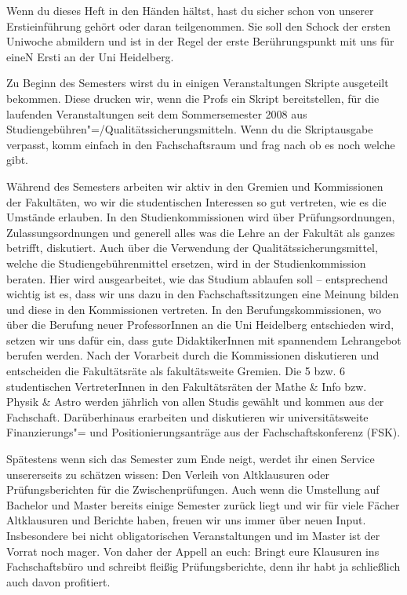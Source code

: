 Wenn du dieses Heft in den Händen hältst, hast du sicher schon von unserer Erstieinführung gehört oder daran teilgenommen. Sie soll den Schock der ersten Uniwoche abmildern und ist in der Regel der erste Berührungspunkt mit uns für eineN Ersti an der Uni Heidelberg.

Zu Beginn des Semesters wirst du in einigen Veranstaltungen Skripte ausgeteilt bekommen. Diese drucken wir, wenn die Profs ein Skript bereitstellen, für die laufenden Veranstaltungen seit dem Sommersemester 2008 aus Studiengebühren"=/Qualitätssicherungsmitteln. Wenn du die Skriptausgabe verpasst, komm einfach in den Fachschaftsraum und frag nach ob es noch welche gibt.

Während des Semesters arbeiten wir aktiv in den Gremien und Kommissionen der Fakultäten, wo wir die studentischen Interessen so gut vertreten, wie es die Umstände erlauben.
In den Studienkommissionen wird über Prüfungsordnungen, Zulassungsordnungen und generell alles was die Lehre an der Fakultät als ganzes betrifft, diskutiert. Auch über die Verwendung der Qualitätssicherungsmittel, welche die Studiengebührenmittel ersetzen, wird in der Studienkommission beraten. Hier wird ausgearbeitet, wie das Studium ablaufen soll -- entsprechend wichtig ist es, dass wir uns dazu in den Fachschaftssitzungen eine Meinung bilden und diese in den Kommissionen vertreten.
In den Berufungskommissionen, wo über die Berufung neuer ProfessorInnen an die Uni Heidelberg entschieden wird, setzen wir uns dafür ein, dass gute DidaktikerInnen mit spannendem Lehrangebot berufen werden.
Nach der Vorarbeit durch die Kommissionen diskutieren und entscheiden die Fakultätsräte als fakultätsweite Gremien. Die 5 bzw. 6 studentischen VertreterInnen in den Fakultätsräten der Mathe \& Info bzw. Physik \& Astro werden jährlich von allen Studis gewählt und kommen aus der Fachschaft.
Darüberhinaus erarbeiten und diskutieren wir universitätsweite Finanzierungs"= und Positionierungsanträge aus der Fachschaftskonferenz (FSK).

Spätestens wenn sich das Semester zum Ende neigt, werdet ihr einen Service unsererseits zu schätzen wissen: Den Verleih von Altklausuren oder Prüfungsberichten für die Zwischenprüfungen. Auch wenn die Umstellung auf Bachelor und Master bereits einige Semester zurück liegt und wir für viele Fächer Altklausuren und Berichte haben, freuen wir uns immer über neuen Input. Insbesondere bei nicht obligatorischen Veranstaltungen und im Master ist der Vorrat noch mager. Von daher der Appell an euch: Bringt eure Klausuren ins Fachschaftsbüro und schreibt fleißig Prüfungsberichte, denn ihr habt ja schließlich auch davon profitiert.



